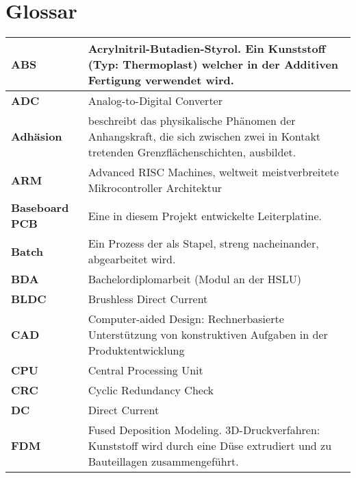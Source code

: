 \newpage
\section*{Glossar}\label{dok:glossar}
\begin{table}[H]
	\footnotesize
	\begin{tabular}{|L{3cm}|L{12.5cm}|}
		\hline	
		\textbf{ABS} & Acrylnitril-Butadien-Styrol. Ein Kunststoff (Typ: Thermoplast) welcher in der Additiven Fertigung verwendet wird.\\
		
		\hline	
		\textbf{ADC} & Analog-to-Digital Converter\\
		
		\hline
		\textbf{Adhäsion} & beschreibt das physikalische Phänomen der Anhangskraft, die sich zwischen zwei in Kontakt tretenden Grenzflächenschichten, ausbildet. \\		

		\hline	
		\textbf{ARM} & Advanced RISC Machines, weltweit meistverbreitete Mikrocontroller Architektur\\

		\hline
		\textbf{Baseboard PCB} & Eine in diesem Projekt entwickelte Leiterplatine. \\

		\hline
		\textbf{Batch} & Ein Prozess der als Stapel, streng nacheinander, abgearbeitet wird.  \\

		\hline
		\textbf{BDA} & Bachelordiplomarbeit (Modul an der HSLU) \\

		\hline
		\textbf{BLDC} & Brushless Direct Current\\

		\hline
		\textbf{CAD} & Computer-aided Design: Rechnerbasierte Unterstützung von konstruktiven Aufgaben in der Produktentwicklung \\
		
		\hline
		\textbf{CPU} & Central Processing Unit \\
		
		\hline
		\textbf{CRC} & Cyclic Redundancy Check \\

		\hline	
		\textbf{DC} & Direct Current\\

		\hline
		\textbf{FDM} & Fused Deposition Modeling. 3D-Druckverfahren: Kunststoff wird durch eine Düse extrudiert und zu Bauteillagen zusammengeführt.\\


\end{tabular}
\end{table}

